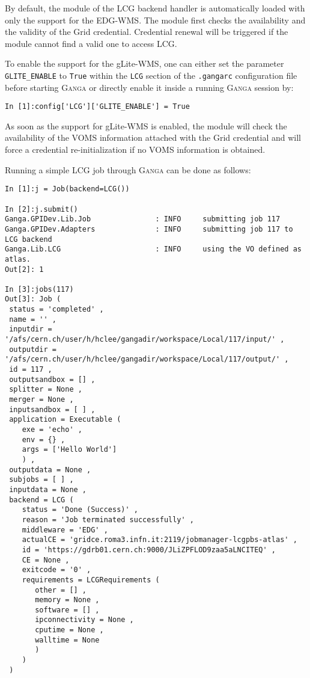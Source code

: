 \documentclass{howto}
\def\ganga {\textsc{Ganga}\xspace}
\begin{document}
By default, the module of the LCG backend handler is automatically loaded
with only the support for the EDG-WMS. The module first checks the availability
and the validity of the Grid credential. Credential renewal will be
triggered if the module cannot find a valid one to access LCG.   

To enable the support for the gLite-WMS, one can either set the parameter
\texttt{GLITE_ENABLE} to \texttt{True} within the \texttt{LCG} section of the
\texttt{.gangarc} configuration file before starting \ganga or directly enable it
inside a running \ganga session by:
\begin{verbatim}
In [1]:config['LCG']['GLITE_ENABLE'] = True
\end{verbatim}

As soon as the support for gLite-WMS is enabled, the module will check the
availability of the VOMS information attached with the Grid credential and
will force a credential re-initialization if no VOMS information is obtained.  

Running a simple LCG job through \ganga can be done as follows:
\begin{verbatim}
In [1]:j = Job(backend=LCG())

In [2]:j.submit()
Ganga.GPIDev.Lib.Job               : INFO     submitting job 117
Ganga.GPIDev.Adapters              : INFO     submitting job 117 to LCG backend
Ganga.Lib.LCG                      : INFO     using the VO defined as atlas.
Out[2]: 1

In [3]:jobs(117)
Out[3]: Job (
 status = 'completed' ,
 name = '' ,
 inputdir = '/afs/cern.ch/user/h/hclee/gangadir/workspace/Local/117/input/' ,
 outputdir = '/afs/cern.ch/user/h/hclee/gangadir/workspace/Local/117/output/' ,
 id = 117 ,
 outputsandbox = [] ,
 splitter = None ,
 merger = None ,
 inputsandbox = [ ] ,
 application = Executable (
    exe = 'echo' ,
    env = {} ,
    args = ['Hello World']
    ) ,
 outputdata = None ,
 subjobs = [ ] ,
 inputdata = None ,
 backend = LCG (
    status = 'Done (Success)' ,
    reason = 'Job terminated successfully' ,
    middleware = 'EDG' ,
    actualCE = 'gridce.roma3.infn.it:2119/jobmanager-lcgpbs-atlas' ,
    id = 'https://gdrb01.cern.ch:9000/JLiZPFLOD9zaa5aLNCITEQ' ,
    CE = None ,
    exitcode = '0' ,
    requirements = LCGRequirements (
       other = [] ,
       memory = None ,
       software = [] ,
       ipconnectivity = None ,
       cputime = None ,
       walltime = None
       )
    )
 )
\end{verbatim}
\end{document}
